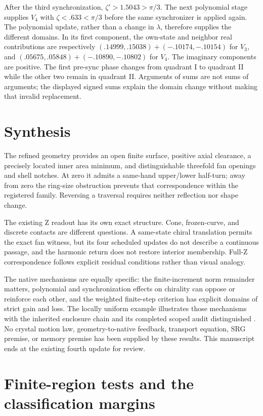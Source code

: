 \documentclass[11pt,a4paper]{article}
\numberwithin{equation}{section}
\begin{document}
After the third synchronization, $\zeta'>1.5043>\pi/3$. The next polynomial
stage supplies $V_4$ with $\zeta<.633<\pi/3$ before the same synchronizer is
applied again. The polynomial update, rather than a change in $\lambda$,
therefore supplies the different domains. In its first component, the
own-state and neighbor real contributions are respectively
$(.14999,.15038)+(-.10174,-.10154)$ for $V_3$, and
$(.05675,.05848)+(-.10890,-.10802)$ for $V_4$.
The imaginary components are positive. The first pre-sync phase changes
from quadrant I to quadrant II while the other two remain in quadrant II.
Arguments of sums are not sums of arguments; the displayed signed sums
explain the domain change without making that invalid replacement.

\section{Synthesis}\label{sec:synthesis}
The refined geometry provides an open finite surface, positive axial
clearance, a precisely located inner area minimum, and distinguishable
threefold fan openings and shell notches. At zero it admits a same-hand
upper/lower half-turn; away from zero the ring-size obstruction prevents
that correspondence within the registered family. Reversing a traversal
requires neither reflection nor shape change.

The existing Z readout has its own exact structure. Cone, frozen-curve,
and discrete contacts are different questions. A same-state chiral
translation permits the exact fan witness, but its four scheduled updates
do not describe a continuous passage, and the harmonic return does not
restore interior membership. Full-Z correspondence follows explicit
residual conditions rather than visual analogy.

The native mechanisms are equally specific: the finite-increment norm
remainder matters, polynomial and synchronization effects on chirality
can oppose or reinforce each other, and the weighted finite-step criterion
has explicit domains of strict gain and loss. The locally uniform example
illustrates those mechanisms with the inherited enclosure chain and its
completed scoped audit distinguished \cite{Audit,GPTAudit}.
No crystal motion law, geometry-to-native feedback, transport equation, SRG
premise, or memory premise has been supplied by these results. This manuscript
ends at the existing fourth update for review.

\appendix

\section{Finite-region tests and the classification margins}\label{app:finite}
\end{document}
